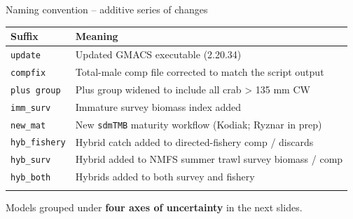 \documentclass[
  10pt,
  ignorenonframetext,
  aspectratio=169,
]{beamer}
\begin{document}
\begin{frame}[fragile]{Naming convention -- additive series of changes}
\label{naming-convention-additive-series-of-changes}
\small

\begin{longtable}[]{@{}
  >{\raggedright\arraybackslash}p{}
  >{\raggedright\arraybackslash}p{}@{}}
\toprule\noalign{}
\begin{minipage}[b]{\linewidth}\raggedright
Suffix
\end{minipage} & \begin{minipage}[b]{\linewidth}\raggedright
Meaning
\end{minipage} \\
\midrule\noalign{}
\endhead
\texttt{update} & Updated GMACS executable (2.20.34) \\
\texttt{compfix} & Total-male comp file corrected to match the script
output \\
\texttt{plus\ group} & Plus group widened to include all crab
\textgreater{} 135 mm CW \\
\texttt{imm\_surv} & Immature survey biomass index added \\
\texttt{new\_mat} & New \texttt{sdmTMB} maturity workflow (Kodiak;
Ryznar in prep) \\
\texttt{hyb\_fishery} & Hybrid catch added to directed-fishery comp /
discards \\
\texttt{hyb\_surv} & Hybrid added to NMFS summer trawl survey biomass /
comp \\
\texttt{hyb\_both} & Hybrids added to both survey and fishery \\
\bottomrule\noalign{}
\end{longtable}

\medskip

\centering Models grouped under \textbf{four axes of uncertainty} in the
next slides.
\end{frame}
\end{document}

